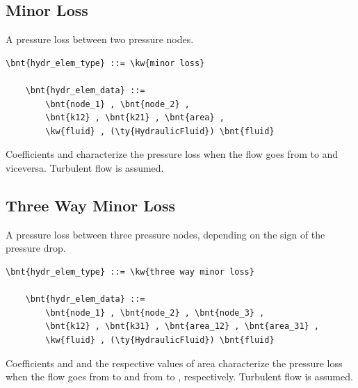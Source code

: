 \subsection{Minor Loss}
A pressure loss between two pressure nodes.
\label{sec:EL:HYDR:MINOR_LOSS}
\begin{Verbatim}[commandchars=\\\{\}]
    \bnt{hydr_elem_type} ::= \kw{minor loss}

    \bnt{hydr_elem_data} ::=
        \bnt{node_1} , \bnt{node_2} ,
        \bnt{k12} , \bnt{k21} , \bnt{area} ,
        \kw{fluid} , (\ty{HydraulicFluid}) \bnt{fluid}
\end{Verbatim}
Coefficients  and  characterize the pressure loss
when the flow goes from  to  and viceversa.
Turbulent flow is assumed.



\subsection{Three Way Minor Loss}
A pressure loss between three pressure nodes,
depending on the sign of the pressure drop.
\label{sec:EL:HYDR:THREE_WAY_MINOR_LOSS}
\begin{Verbatim}[commandchars=\\\{\}]
    \bnt{hydr_elem_type} ::= \kw{three way minor loss}

    \bnt{hydr_elem_data} ::=
        \bnt{node_1} , \bnt{node_2} , \bnt{node_3} ,
        \bnt{k12} , \bnt{k31} , \bnt{area_12} , \bnt{area_31} ,
        \kw{fluid} , (\ty{HydraulicFluid}) \bnt{fluid}
\end{Verbatim}
Coefficients  and  and the respective values of area
characterize the pressure loss when the flow goes
from  to  and from  to ,
respectively.
Turbulent flow is assumed.



